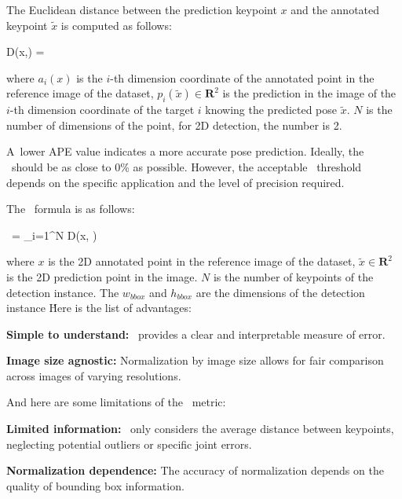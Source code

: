 The Euclidean distance between the prediction keypoint $ x $ and the annotated keypoint $ \tilde{x}$ is computed as follows:

\startplaceformula[reference=formula:euclidean-distance]
    \startformula D(x,) = 
    \stopformula
\stopplaceformula

where $ a_i (x) $ is the $ i $-th dimension coordinate of the annotated point in the reference image of the dataset, $ p_i (\tilde{x}) \in  \mathbf R^2 $ is the prediction in the image of the $ i $-th dimension coordinate of the target $ i $ knowing the predicted pose $ \tilde{x} $. $ N $ is the number of dimensions of the point, for 2D detection, the number is 2.

A~lower APE value indicates a more accurate pose prediction. Ideally, the \APE\ should be as close to 0\% as possible. However, the acceptable \APE\ threshold depends on the specific application and the level of precision required.

The \APE\ formula is as follows:

\startplaceformula[reference=formula:ape]
    \startformula \APE\ =  \sum_{i=1}^{N} D(x, ) 
    \stopformula
\stopplaceformula

where $ x $ is the 2D annotated point in the reference image of the dataset, $ \tilde{x} \in  \mathbf R^2 $ is the 2D prediction point in the image. $ N $ is the number of keypoints of the detection instance. The $ w_{bbox} $ and $ h_{bbox} $ are the dimensions of the detection instance \BBOX\.

Here is the list of advantages:
\startitemize[1]
    \item {\bf Simple to understand:} \APE\ provides a clear and interpretable measure of error.
    \item {\bf Image size agnostic:} Normalization by image size allows for fair comparison across images of varying resolutions.
\stopitemize

And here are some limitations of the \APE\ metric:
\startitemize[1]
    \item {\bf Limited information:} \APE\ only considers the average distance between keypoints, neglecting potential outliers or specific joint errors.
    \item {\bf Normalization dependence:} The accuracy of normalization depends on the quality of bounding box information.
\stopitemize


